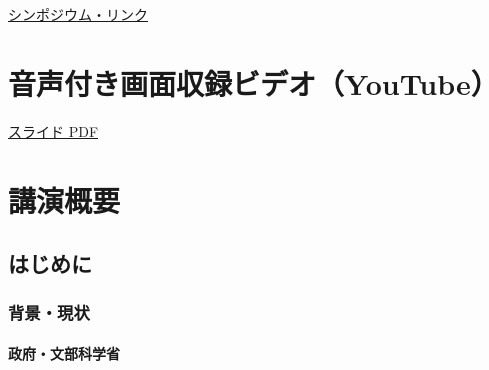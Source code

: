 \documentclass[
]{book}
\theoremstyle{definition}
\theoremstyle{definition}
\theoremstyle{definition}
\theoremstyle{definition}
\theoremstyle{remark}
\begin{document}
\href{https://www.mathsoc.jp/overview/committee/education/sympo/2019sep.html}{シンポジウム・リンク}

\hypertarget{ux97f3ux58f0ux4ed8ux304dux753bux9762ux53ceux9332ux30d3ux30c7ux30aayoutube}{%
\section{音声付き画面収録ビデオ（YouTube）}\label{ux97f3ux58f0ux4ed8ux304dux753bux9762ux53ceux9332ux30d3ux30c7ux30aayoutube}}

\href{https://icu-hsuzuki.github.io/datascience/ed/msj2019.pdf}{スライド PDF}

\hypertarget{ux8b1bux6f14ux6982ux8981}{%
\section{講演概要}\label{ux8b1bux6f14ux6982ux8981}}

\hypertarget{ux306fux3058ux3081ux306b-1}{%
\subsection{はじめに}\label{ux306fux3058ux3081ux306b-1}}

\hypertarget{ux80ccux666fux73feux72b6}{%
\subsubsection{背景・現状}\label{ux80ccux666fux73feux72b6}}

\hypertarget{ux653fux5e9cux6587ux90e8ux79d1ux5b66ux7701}{%
\paragraph{政府・文部科学省}\label{ux653fux5e9cux6587ux90e8ux79d1ux5b66ux7701}}
\end{document}
